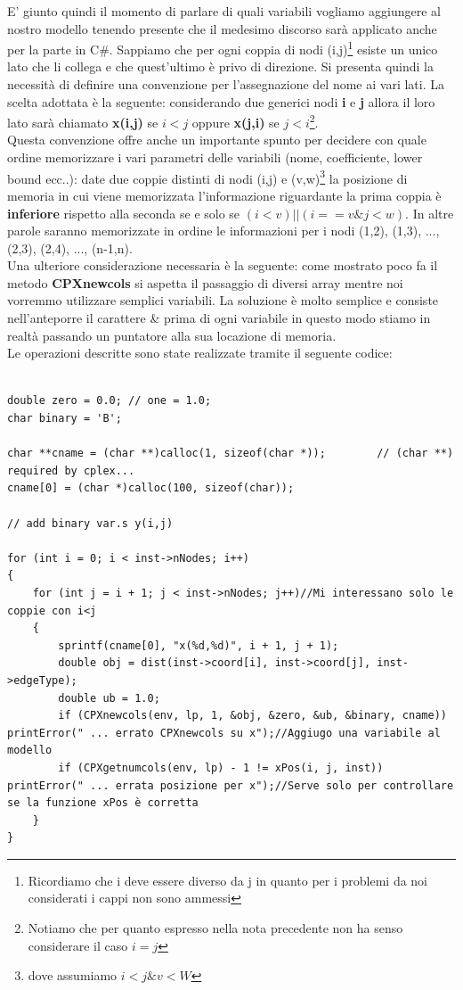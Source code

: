\documentclass[11pt]{article}
\begin{document}
E' giunto quindi il momento di parlare di quali variabili vogliamo aggiungere al nostro modello tenendo presente che il medesimo discorso sarà applicato anche per la parte in C\#. Sappiamo che per ogni coppia di nodi (i,j)\footnote{Ricordiamo che i deve essere diverso da j in quanto per i problemi da noi considerati i cappi non sono ammessi} esiste un unico lato che li collega e che quest'ultimo è privo di direzione. Si presenta quindi la necessità di definire una convenzione per l'assegnazione del nome ai vari lati. La scelta adottata è la seguente: considerando due generici nodi \textbf{i} e \textbf{j} allora il loro lato sarà chiamato \textbf{x(i,j)} se $i<j$ oppure \textbf{x(j,i)} se $j<i$\footnote{Notiamo che per quanto espresso nella nota precedente non ha senso considerare il caso $i=j$}.\\
Questa convenzione offre anche un importante spunto per decidere con quale ordine memorizzare i vari parametri delle variabili (nome, coefficiente, lower bound ecc..): date due coppie distinti di nodi (i,j) e (v,w)\footnote{dove assumiamo $i<j \& v<W$} la posizione di memoria in cui viene memorizzata l'informazione riguardante la prima coppia è \textbf{inferiore} rispetto alla seconda se e solo se $(i<v) || (i==v \& j<w)$. In altre parole saranno memorizzate in ordine le informazioni per i nodi (1,2), (1,3), ..., (2,3), (2,4), ..., (n-1,n).\\
Una ulteriore considerazione necessaria è la seguente: come mostrato poco fa il metodo \textbf{CPXnewcols} si aspetta il passaggio di diversi array mentre noi vorremmo utilizzare semplici variabili. La soluzione è molto semplice e consiste nell'anteporre il carattere \& prima di ogni variabile in questo modo stiamo in realtà passando un puntatore alla sua locazione di memoria.\\

Le operazioni descritte sono state realizzate tramite il seguente codice:

\begin{lstlisting}

double zero = 0.0; // one = 1.0;     
char binary = 'B';

char **cname = (char **)calloc(1, sizeof(char *));        // (char **) required by cplex...
cname[0] = (char *)calloc(100, sizeof(char));

// add binary var.s y(i,j)      

for (int i = 0; i < inst->nNodes; i++)
{
    for (int j = i + 1; j < inst->nNodes; j++)//Mi interessano solo le coppie con i<j
    {
        sprintf(cname[0], "x(%d,%d)", i + 1, j + 1);
        double obj = dist(inst->coord[i], inst->coord[j], inst->edgeType);
        double ub = 1.0;
        if (CPXnewcols(env, lp, 1, &obj, &zero, &ub, &binary, cname)) printError(" ... errato CPXnewcols su x");//Aggiugo una variabile al modello
        if (CPXgetnumcols(env, lp) - 1 != xPos(i, j, inst)) printError(" ... errata posizione per x");//Serve solo per controllare se la funzione xPos è corretta
    }
}

\end{lstlisting}
\end{document}
